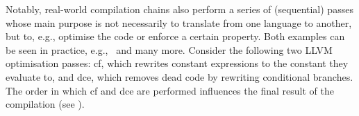 \documentclass[acmsmall]{acmart}
\theoremstyle{definition}
\begin{document}
Notably, real-world compilation chains also perform a series of (sequential) passes whose main purpose is not necessarily to translate from one language to another, but to, e.g., optimise the code or enforce a certain property.
Both examples can be seen in practice, e.g.,~\cite{nagarakatte2009soft,nagarakatte2010cets,akritidis2009baggy,wegman1991ccp,manjikian1997fusion} and many more.
% 
Consider the following two LLVM optimisation passes: \gls*{cf}, which rewrites constant expressions to the constant they evaluate to, and \gls*{dce}, which removes dead code by rewriting conditional branches.
The order in which \gls*{cf} and \gls*{dce} are performed influences the final result of the compilation (see ).
\end{document}
